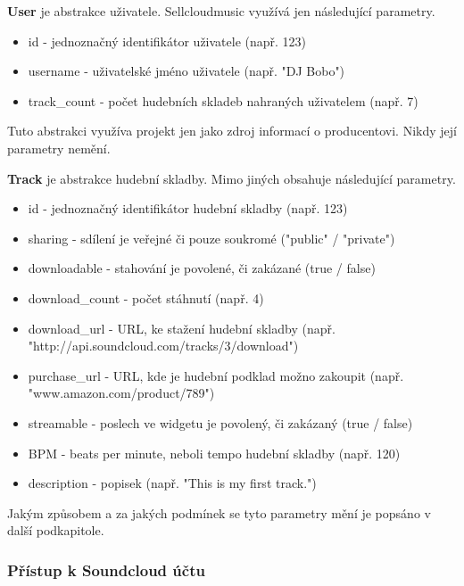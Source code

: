 \documentclass[12pt]{article}
\begin{document}
\begin{description}
\item{\textbf{User}} je abstrakce uživatele. Sellcloudmusic využívá jen následující parametry.

\begin{itemize}
\item{id} - jednoznačný identifikátor uživatele (např. 123)
\item{username} - uživatelské jméno uživatele (např. "DJ Bobo")
\item{track\_count} - počet hudebních skladeb nahraných uživatelem (např. 7)
\end{itemize}

Tuto abstrakci využíva projekt jen jako zdroj informací o producentovi. Nikdy její parametry nemění.

\item{\textbf{Track}} je abstrakce hudební skladby. Mimo jiných obsahuje následující parametry.

\begin{itemize}
\item{id} - jednoznačný identifikátor hudební skladby (např. 123)
\item{sharing} - sdílení je veřejné či pouze soukromé ("public" / "private")
\item{downloadable} - stahování je povolené, či zakázané (true / false)
\item{download\_count} - počet stáhnutí (např. 4)
\item{download\_url} - URL, ke stažení hudební skladby (např. "http://api.soundcloud.com/tracks/3/download")
\item{purchase\_url} - URL, kde je hudební podklad možno zakoupit (např. "www.amazon.com/product/789")
\item{streamable} - poslech ve widgetu je povolený, či zakázaný (true / false)
\item{BPM} - beats per minute, neboli tempo hudební skladby (např. 120)
\item{description} - popisek (např. "This is my first track.")
\end{itemize}

\end{description}

Jakým způsobem a za jakých podmínek se tyto parametry mění je popsáno v další podkapitole.

\subsubsection{Přístup k Soundcloud účtu}
\end{document}
